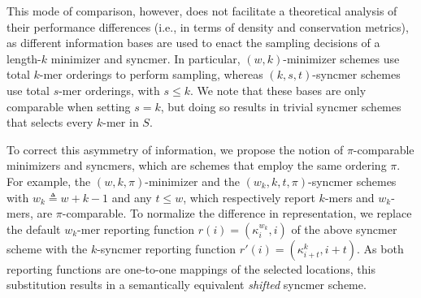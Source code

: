 This mode of comparison, however, does not facilitate a theoretical analysis of their performance differences (i.e., in terms of density and conservation metrics), as different information bases are used to enact the sampling decisions of a length-$k$ minimizer and syncmer. In particular, $(w, k)$-minimizer schemes use total $k$-mer orderings to perform sampling, whereas $(k, s, t)$-syncmer schemes use total $s$-mer orderings, with $s \leq k$. We note that these bases are only comparable when setting $s=k$, but doing so results in trivial syncmer schemes that selects every $k$-mer in $S$. 

To correct this asymmetry of information, we propose the notion of $\pi$-comparable minimizers and syncmers, which are schemes that employ the same ordering $\pi$. For example, the $(w, k, \pi)$-minimizer and the $(w_k, k, t, \pi)$-syncmer schemes with $w_k\triangleq w+k-1$ and any $t \leq w$, which respectively report $k$-mers and $w_k$-mers, are $\pi$-comparable. To normalize the difference in representation, we replace the default $w_k$-mer reporting function $r(i)=(\kappa^{w_k}_i, i)$ of the above syncmer scheme with the $k$-syncmer reporting function $r'(i)=(\kappa^k_{i+t}, i+t)$. As both reporting functions are one-to-one mappings of the selected locations, this substitution results in a semantically equivalent \textit{shifted} syncmer scheme.


